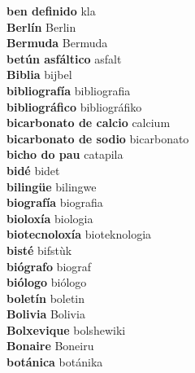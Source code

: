 \textbf{ ben definido  } kla \\
\textbf{ Berlín  } Berlin \\
\textbf{ Bermuda  } Bermuda \\
\textbf{ betún asfáltico  } asfalt \\
\textbf{ Biblia  } bijbel \\
\textbf{ bibliografía  } bibliografia \\
\textbf{ bibliográfico  } bibliográfiko \\
\textbf{ bicarbonato de calcio  } calcium \\
\textbf{ bicarbonato de sodio  } bicarbonato \\
\textbf{ bicho do pau  } catapila \\
\textbf{ bidé  } bidet \\
\textbf{ bilingüe  } bilingwe \\
\textbf{ biografía  } biografia \\
\textbf{ bioloxía  } biologia \\
\textbf{ biotecnoloxía  } bioteknologia \\
\textbf{ bisté  } bifstùk \\
\textbf{ biógrafo  } biograf \\
\textbf{ biólogo  } biólogo \\
\textbf{ boletín  } boletin \\
\textbf{ Bolivia  } Bolivia \\
\textbf{ Bolxevique  } bolshewiki \\
\textbf{ Bonaire  } Boneiru \\
\textbf{ botánica  } botánika \\
